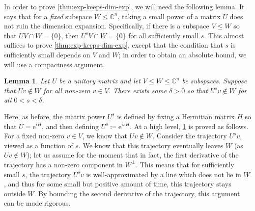 \documentclass[11pt]{article}
\newtheorem{lemma}[theorem]{Lemma}
\newcommand{\eee}{\mathrm e}
\theoremstyle{plain}
\numberwithin{equation}{section}
\theoremstyle{definition}
\newcommand{\bC}{\mathbb{C}}
\begin{document}
In order to prove \cref{thm:exp-keeps-dim-exp}, we will need the following lemma. It says that for a \emph{fixed} subspace $W \leq \bC^n$, taking a small power of a matrix $U$ does not 
%
ruin the dimension expansion. 
%
%
Specifically, %
if there is a subspace $V \leq W$ so that $UV \cap W = \{0\}$, then $U^s V \cap W=\{0\}$ for all sufficiently small $s$. This almost suffices to prove \cref{thm:exp-keeps-dim-exp}, except that the 
%
%
%
condition that $s$ is sufficiently small %
%
depends on $V$ and $W$; in order to obtain an absolute bound,
%
%
%
we will use a compactness argument.
\begin{lemma}\label{lem:small-power}
    Let $U$ be a unitary matrix and let $V \leq W \leq \bC^n$ be subspaces. Suppose that $Uv \notin W$ for all non-zero $v \in V$. There exists some $\delta>0$ so that $U^s v \notin W$ for all $0<s<\delta$.
\end{lemma}
Here, as before, the matrix power $U^s$ is defined by fixing a Hermitian matrix $H$ so that $U=\eee^{iH}$, and then defining %
%
$U^s \coloneqq \eee^{isH}$.  %
At a high level, \cref{lem:small-power} is proved as follows. For a fixed non-zero $v \in V$, we know that $Uv \notin W$. Consider the 
%
trajectory
%
$U^s v$, viewed as a function of $s$. We know that this trajectory eventually leaves $W$ (as $Uv \notin W$); let us assume for the moment that in fact, the first derivative of the trajectory has a non-zero component in $W^\perp$. This means that for sufficiently small $s$, the trajectory $U^s v$ is well-approximated by a line which does not lie in $W$, and thus for some small but positive amount of time, this trajectory stays outside $W$. By bounding the second derivative of the trajectory, this argument can be made rigorous. 
\end{document}
